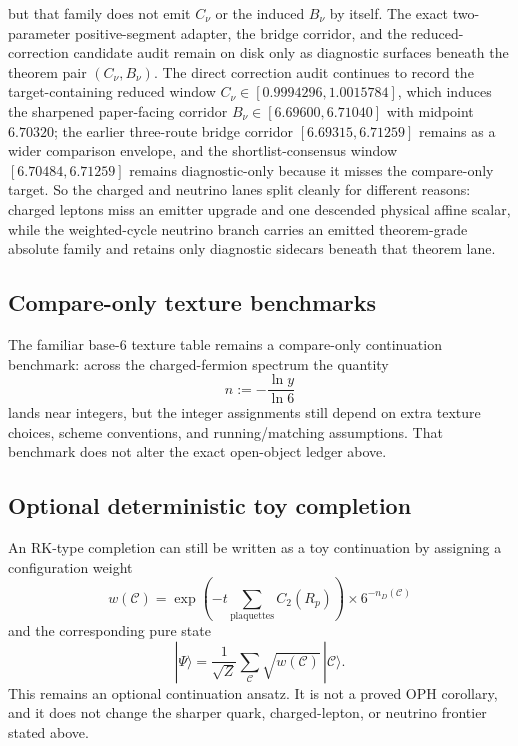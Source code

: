 but that family does not emit \(C_\nu\) or the induced \(B_\nu\) by itself. The exact two-parameter positive-segment adapter, the bridge corridor, and the reduced-correction candidate audit remain on disk only as diagnostic surfaces beneath the theorem pair \((C_\nu,B_\nu)\). The direct correction audit continues to record the target-containing reduced window \(C_\nu\in[0.9994296,1.0015784]\), which induces the sharpened paper-facing corridor \(B_\nu\in[6.69600,6.71040]\) with midpoint \(6.70320\); the earlier three-route bridge corridor \([6.69315,6.71259]\) remains as a wider comparison envelope, and the shortlist-consensus window \([6.70484,6.71259]\) remains diagnostic-only because it misses the compare-only target. So the charged and neutrino lanes split cleanly for different reasons: charged leptons miss an emitter upgrade and one descended physical affine scalar, while the weighted-cycle neutrino branch carries an emitted theorem-grade absolute family and retains only diagnostic sidecars beneath that theorem lane.

\subsection{Compare-only texture benchmarks}\label{123-the-yukawa-spectrum}

The familiar base-6 texture table remains a compare-only continuation benchmark: across the charged-fermion spectrum the quantity
\[
n:=-\frac{\ln y}{\ln 6}
\]
lands near integers, but the integer assignments still depend on extra texture choices, scheme conventions, and running/matching assumptions. That benchmark does not alter the exact open-object ledger above.

\subsection{Optional deterministic toy completion}\label{124-deterministic-completion-rk-hamiltonian}

An RK-type completion can still be written as a toy continuation by assigning a configuration weight
\[
w(\mathcal C)=\exp\!\left(-t\sum_{\text{plaquettes}}C_2(R_p)\right)\times 6^{-n_D(\mathcal C)}
\]
and the corresponding pure state
\[
|\Psi\rangle
=
\frac{1}{\sqrt Z}\sum_{\mathcal C}\sqrt{w(\mathcal C)}\,|\mathcal C\rangle.
\]
This remains an optional continuation ansatz. It is not a proved OPH corollary, and it does not change the sharper quark, charged-lepton, or neutrino frontier stated above.

